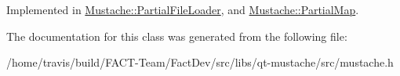 Implemented in \hyperlink{classMustache_1_1PartialFileLoader_a36ba8b817708a8755293db46bceb0dbb}{Mustache\-::\-Partial\-File\-Loader}, and \hyperlink{classMustache_1_1PartialMap_a676a6f9a77cdd53e91b18216733b2781}{Mustache\-::\-Partial\-Map}.



The documentation for this class was generated from the following file\-:\begin{DoxyCompactItemize}
\item 
/home/travis/build/\-F\-A\-C\-T-\/\-Team/\-Fact\-Dev/src/libs/qt-\/mustache/src/mustache.\-h\end{DoxyCompactItemize}
